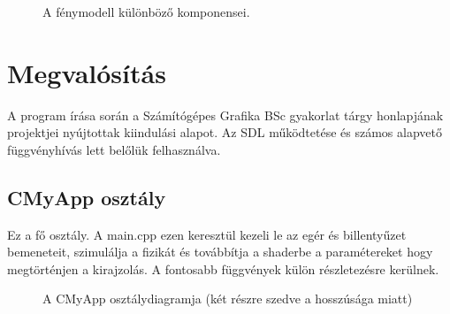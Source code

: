 \begin{figure}[H]
	\centering
	\hspace{1pt}
	\hspace{1pt}
	\vspace{1pt}
	\hspace{1pt}
	\hspace{1pt}
	\vspace{1pt}
	\hspace{1pt}
	\caption{A fénymodell különböző komponensei.}
	\label{fig:lighting}
\end{figure}


\section{Megvalósítás}

A program írása során a Számítógépes Grafika BSc gyakorlat tárgy honlapjának \cite{GrafikaB26:online} projektjei nyújtottak kiindulási alapot. Az SDL működtetése és számos alapvető függvényhívás lett belőlük felhasználva.

\subsection{CMyApp osztály}

Ez a fő osztály. A main.cpp ezen keresztül kezeli le az egér és billentyűzet bemeneteit, szimulálja a fizikát és továbbítja a shaderbe a paramétereket hogy megtörténjen a kirajzolás. A fontosabb függvények külön részletezésre kerülnek.

\begin{figure}[H]
	\centering
	\hspace{1pt}
	\caption{A CMyApp osztálydiagramja (két részre szedve a hosszúsága miatt)}
	\label{fig:uml}
\end{figure}

